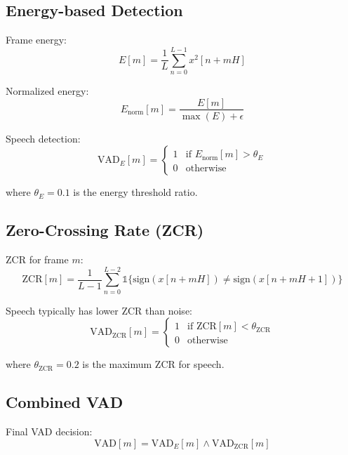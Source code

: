 \documentclass[12pt,a4paper]{article}
\begin{document}
\subsection{Energy-based Detection}

Frame energy:
\begin{equation}
E[m] = \frac{1}{L} \sum_{n=0}^{L-1} x^2[n + mH]
\end{equation}

Normalized energy:
\begin{equation}
E_{\text{norm}}[m] = \frac{E[m]}{\max(E) + \epsilon}
\end{equation}

Speech detection:
\begin{equation}
\text{VAD}_E[m] = \begin{cases}
1 & \text{if } E_{\text{norm}}[m] > \theta_E \\
0 & \text{otherwise}
\end{cases}
\end{equation}

where $\theta_E = 0.1$ is the energy threshold ratio.

\subsection{Zero-Crossing Rate (ZCR)}

ZCR for frame $m$:
\begin{equation}
\text{ZCR}[m] = \frac{1}{L-1} \sum_{n=0}^{L-2} \mathbb{1}\{\text{sign}(x[n + mH]) \neq \text{sign}(x[n + mH + 1])\}
\end{equation}

Speech typically has lower ZCR than noise:
\begin{equation}
\text{VAD}_{\text{ZCR}}[m] = \begin{cases}
1 & \text{if } \text{ZCR}[m] < \theta_{\text{ZCR}} \\
0 & \text{otherwise}
\end{cases}
\end{equation}

where $\theta_{\text{ZCR}} = 0.2$ is the maximum ZCR for speech.

\subsection{Combined VAD}

Final VAD decision:
\begin{equation}
\text{VAD}[m] = \text{VAD}_E[m] \land \text{VAD}_{\text{ZCR}}[m]
\end{equation}
\end{document}
